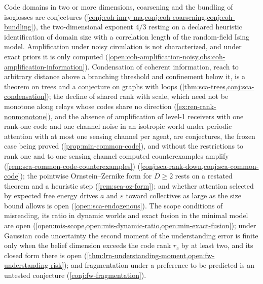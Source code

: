 Code domains in two or more dimensions, coarsening and the bundling of isoglosses are conjectures (\cref{conj:coh-imry-ma,conj:coh-coarsening,conj:coh-bundling}), the two-dimensional exponent $4/3$ resting on a declared heuristic identification of domain size with a correlation length of the random-field Ising model. Amplification under noisy circulation is not characterized, and under exact priors it is only computed (\cref{open:coh-amplification-noisy,obs:coh-amplification-information}). Condensation of coherent information, reach to arbitrary distance above a branching threshold and confinement below it, is a theorem on trees and a conjecture on graphs with loops (\cref{thm:sca-trees,conj:sca-condensation}); the decline of shared rank with scale, which need not be monotone along relays whose codes share no direction (\cref{ex:ren-rank-nonmonotone}), and the absence of amplification of level-1 receivers with one rank-one code and one channel noise in an isotropic world under periodic attention with at most one sensing channel per agent, are conjectures, the frozen case being proved (\cref{prop:min-common-code}), and without the restrictions to rank one and to one sensing channel computed counterexamples amplify (\cref{rem:sca-common-code-counterexamples}) (\cref{conj:sca-rank-down,conj:sca-common-code}); the pointwise Ornstein--Zernike form for $D\ge2$ rests on a restated theorem and a heuristic step (\cref{rem:sca-oz-form}); and whether attention selected by expected free energy drives $a$ and $\varepsilon$ toward collectives as large as the size bound allows is open (\cref{open:sca-endogenous}). The scope conditions of misreading, its ratio in dynamic worlds and exact fusion in the minimal model are open (\cref{open:mis-scope,open:mis-dynamic-ratio,open:min-exact-fusion}); under Gaussian code uncertainty the second moment of the understanding error is finite only when the belief dimension exceeds the code rank $r_c$ by at least two, and its closed form there is open (\cref{thm:lrn-understanding-moment,open:fw-understanding-risk}); and fragmentation under a preference to be predicted is an untested conjecture (\cref{conj:fw-fragmentation}).

